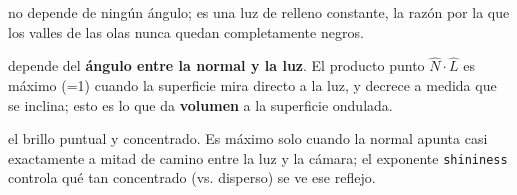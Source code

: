 ﻿\documentclass[11pt]{article}
\begin{document}
\begin{description}[leftmargin=1.2em]
  \item[Ambiental ($k_a L_a$):] no depende de ningún ángulo; es una luz de
        relleno constante, la razón por la que los valles de las olas nunca
        quedan completamente negros.
  \item[Difusa ($k_d L_d (\hat N \cdot \hat L)$):] depende del \textbf{ángulo
        entre la normal y la luz}. El producto punto $\hat N \cdot \hat L$ es
        máximo (=1) cuando la superficie mira directo a la luz, y decrece a
        medida que se inclina; esto es lo que da \textbf{volumen} a la
        superficie ondulada.
  \item[Especular ($k_s L_s (\hat N \cdot \hat H)^{\text{shininess}}$):] el
        brillo puntual y concentrado. Es máximo solo cuando la normal apunta
        casi exactamente a mitad de camino entre la luz y la cámara; el
        exponente \texttt{shininess} controla qué tan concentrado (vs.
        disperso) se ve ese reflejo.
\end{description}
\end{document}
